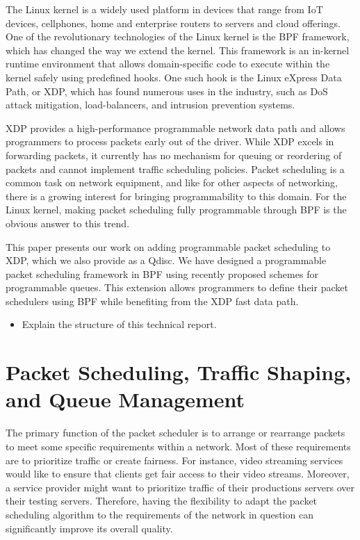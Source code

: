 \documentclass[sigconf, nonacm]{acmart}
\begin{document}
The Linux kernel is a widely used platform in devices that range from IoT devices, cellphones, home and enterprise routers to servers and cloud offerings. One of the revolutionary technologies of the Linux kernel is the BPF framework, which has changed the way we extend the kernel. This framework is an in-kernel runtime environment that allows domain-specific code to execute within the kernel safely using predefined hooks. One such hook is the Linux eXpress Data Path\cite{hoiland2018express}, or XDP, which has found numerous uses in the industry, such as DoS attack mitigation, load-balancers, and intrusion prevention systems.

XDP provides a high-performance programmable network data path and allows programmers to process packets early out of the driver. While XDP excels in forwarding packets, it currently has no mechanism for queuing or reordering of packets and cannot implement traffic scheduling policies. Packet scheduling is a common task on network equipment, and like for other aspects of networking, there is a growing interest for bringing programmability to this domain. For the Linux kernel, making packet scheduling fully programmable through BPF is the obvious answer to this trend.

This paper presents our work on adding programmable packet scheduling to XDP, which we also provide as a Qdisc. We have designed a programmable packet scheduling framework in BPF using recently proposed schemes for programmable queues. This extension allows programmers to define their packet schedulers using BPF while benefiting from the XDP fast data path.

\begin{itemize}
\item Explain the structure of this technical report.
\end{itemize}


\section{Packet Scheduling, Traffic Shaping, and Queue Management}

The primary function of the packet scheduler is to arrange or rearrange packets to meet some specific requirements within a network. Most of these requirements are to prioritize traffic or create fairness. For instance, video streaming services would like to ensure that clients get fair access to their video streams. Moreover, a service provider might want to prioritize traffic of their productions servers over their testing servers. Therefore, having the flexibility to adapt the packet scheduling algorithm to the requirements of the network in question can significantly improve its overall quality.
\end{document}

